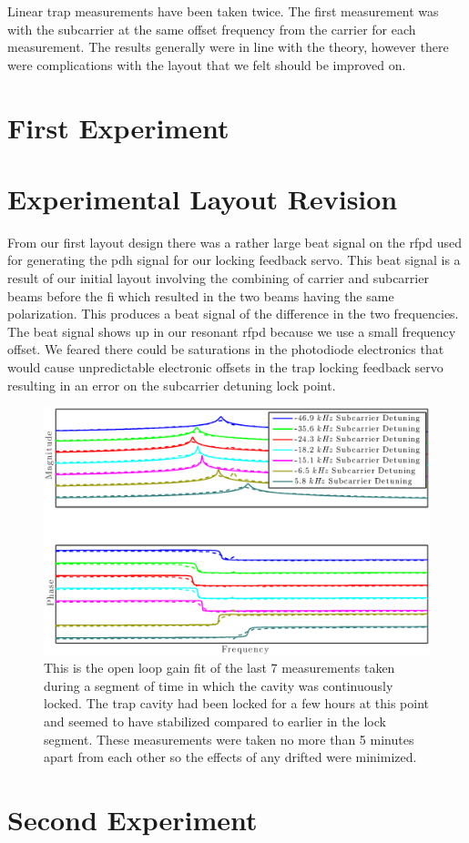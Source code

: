 Linear trap measurements have been taken twice.
The first measurement was with the subcarrier at the same offset frequency from
the carrier for each measurement.
The results generally were in line with the theory, however there were
complications with the layout that we felt should be improved on.

\section{First Experiment}

\section{Experimental Layout Revision}
From our first layout design there was a rather
large beat signal on the \ac{rfpd} used for generating the \ac{pdh} signal
for our locking feedback servo.
This beat signal is a result of our initial layout involving the combining of
carrier and subcarrier beams before the \ac{fi} which resulted in the two beams
having the same polarization.
This produces a beat signal of the difference in the two frequencies.
The beat signal shows up in our resonant \ac{rfpd} because we use a small
frequency offset.
We feared there could be saturations in the photodiode electronics that would
cause unpredictable electronic offsets in the trap locking feedback servo
resulting in an error on the subcarrier detuning lock point.

\begin{figure}[htbp]
    \centering
    \includegraphics[width=20cm]{./figures/april_results_olgfit.eps}
    \caption[Data Fitting of Open Loop Gain for 1st Results]{This is the open
        loop gain fit of the last 7 measurements taken during a segment of
        time in which the cavity was continuously locked.
        The trap cavity had been locked for a few hours at this point and
        seemed to have stabilized compared to earlier in the lock segment.
        These measurements were taken no more than 5 minutes apart from each
        other so the effects of any drifted were minimized.}
    \label{fig:olgapril}
\end{figure}

\section{Second Experiment}

